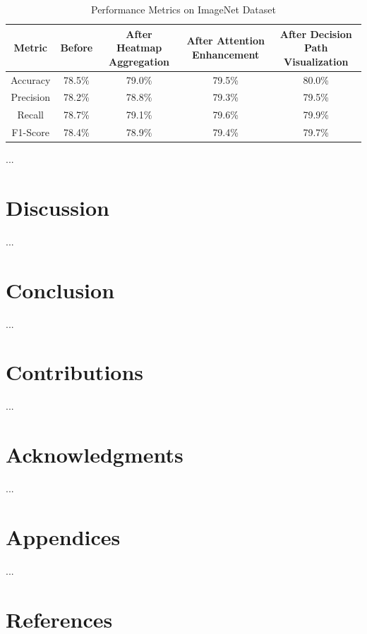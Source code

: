 \begin{table}[ht]
\centering
\begin{tabular}{|c|c|c|c|c|}
\hline
\textbf{Metric} & \textbf{Before} & \textbf{After Heatmap Aggregation} & \textbf{After Attention Enhancement} & \textbf{After Decision Path Visualization} \\ \hline
Accuracy        & 78.5\%          & 79.0\%                             & 79.5\%                                 & 80.0\%                                  \\ \hline
Precision       & 78.2\%          & 78.8\%                             & 79.3\%                                 & 79.5\%                                  \\ \hline
Recall          & 78.7\%          & 79.1\%                             & 79.6\%                                 & 79.9\%                                  \\ \hline
F1-Score        & 78.4\%          & 78.9\%                             & 79.4\%                                 & 79.7\%                                  \\ \hline
\end{tabular}
\caption{Performance Metrics on ImageNet Dataset}
\label{tab:imagenet_results}
\end{table}

...

\section{Discussion}
...

\section{Conclusion}
...

\section{Contributions}
...

\section{Acknowledgments}
...

\section{Appendices}
...

\section{References}




